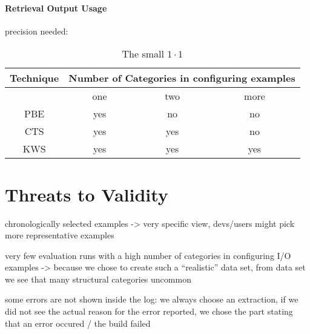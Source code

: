 \documentclass[\myrootdir/main.tex]{subfiles}
\begin{document}
\paragraph{Retrieval Output Usage}
precision needed:

\begin{table}[htbp]
\begin{tabular}{|c||c|c|c|}
  Technique & \multicolumn{3}{|c|}{Number of Categories in configuring examples} \\
  \hline
  & one & two & more \\
  PBE & yes & no & no \\ 
  CTS & yes & yes & no \\ 
  KWS & yes & yes & yes \\ 
  \hline
\end{tabular}
\caption{The small $1 \cdot 1$}
\label{tab:101}
\end{table}

\section{Threats to Validity}
chronologically selected examples -> very specific view, devs/users might pick more representative examples

very few evaluation runs with a high number of categories in configuring I/O examples -> because we chose to create such a ``realistic'' data set, from data set we see that many structural categories uncommon

some errors are not shown inside the log: we always choose an extraction, if we did not see the actual reason for the error reported, we chose the part stating that an error occured / the build failed
\end{document}
